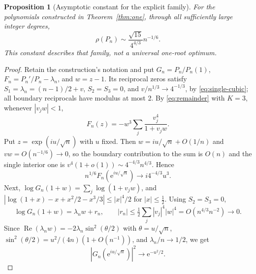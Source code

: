 \documentclass[11pt]{article}
\newtheorem{proposition}[theorem]{Proposition}
\theoremstyle{remark}\newtheorem{remark}[theorem]{Remark}
\newcommand{\Rea}{\operatorname{Re}}
\newcommand{\ee}{\mathrm e}
\begin{document}
\begin{proposition}[Asymptotic constant for the explicit family]\label{prop:prefactor}
For the polynomials constructed in Theorem~\ref{thm:one},
through all sufficiently large integer degrees,
\[
 \rho(P_n)\sim\frac{\sqrt{15}}{4^{4/3}}n^{-1/6}.
\]
This constant describes that family, not a universal one-root optimum.
\end{proposition}
\begin{proof}
Retain the construction's notation and put
\(G_n=P_n/P_n(1)\), \(F_n=P_n'/P_n-\lambda_n\), and \(w=z-1\).
Its reciprocal zeros satisfy \(S_1=\lambda_n=(n-1)/2+v\),
\(S_2=S_3=0\), and \(v/n^{1/3}\to4^{-1/3}\), by \eqref{eq:single-cubic};
all boundary reciprocals have modulus at most 2. By
\eqref{eq:remainder} with \(K=3\), whenever \(|v_jw|<1\),
\[
 F_n(z)=-w^3\sum_j\frac{v_j^4}{1+v_jw}.
\]
Put \(z=\exp(iu/\sqrt n)\) with \(u\) fixed. Then \(w=iu/\sqrt n+O(1/n)\) and
\(vw=O(n^{-1/6})\to0\), so the boundary contribution to the sum is \(O(n)\)
and the single interior one is \(v^4(1+o(1))\sim4^{-4/3}n^{4/3}\). Hence
\begin{equation}\label{eq:prefactor-profile}
 n^{1/6}F_n(\ee^{iu/\sqrt n})\longrightarrow
       i4^{-4/3}u^3 .
\end{equation}
Next, \(\log G_n(1+w)=\sum_j\log(1+v_jw)\), and
\(|\log(1+x)-x+x^2/2-x^3/3|\le|x|^4/2\) for \(|x|\le\frac12\). Using
\(S_2=S_3=0\),
\[
 \log G_n(1+w)=\lambda_nw+r_n,\qquad
 |r_n|\le\tfrac12\sum_j|v_j|^4|w|^4=O(n^{4/3}n^{-2})\to0 .
\]
Since \(\Rea(\lambda_nw)=-2\lambda_n\sin^2(\theta/2)\) with
\(\theta=u/\sqrt n\), \(\sin^2(\theta/2)=u^2/(4n)(1+O(n^{-1}))\), and
\(\lambda_n/n\to1/2\), we get
\begin{equation}\label{eq:prefactor-weight}
 |G_n(\ee^{iu/\sqrt n})|^2\longrightarrow\ee^{-u^2/2}.
\end{equation}


\end{proof}
\end{document}
